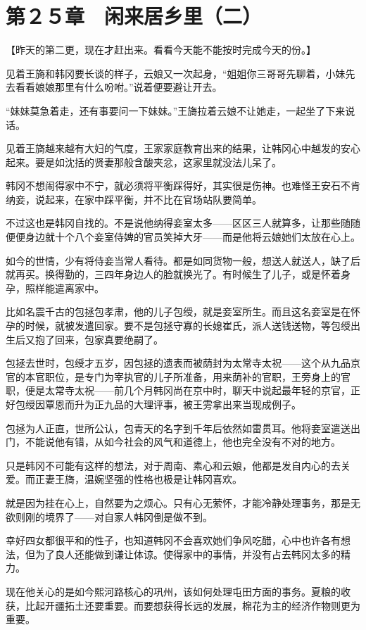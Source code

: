 \section{第２５章　闲来居乡里（二）}

【昨天的第二更，现在才赶出来。看看今天能不能按时完成今天的份。】

见着王旖和韩冈要长谈的样子，云娘又一次起身，“姐姐你三哥哥先聊着，小妹先去看看娘娘那里有什么吩咐。”说着便要避让开去。

“妹妹莫急着走，还有事要问一下妹妹。”王旖拉着云娘不让她走，一起坐了下来说话。

见着王旖越来越有大妇的气度，王家家庭教育出来的结果，让韩冈心中越发的安心起来。要是如沈括的贤妻那般含酸夹忿，这家里就没法儿呆了。

韩冈不想闹得家中不宁，就必须将平衡踩得好，其实很是伤神。也难怪王安石不肯纳妾，说起来，在家中踩平衡，并不比在官场站队要简单。

不过这也是韩冈自找的。不是说他纳得妾室太多——区区三人就算多，让那些随随便便身边就十个八个妾室侍婢的官员笑掉大牙——而是他将云娘她们太放在心上。

如今的世情，少有将侍妾当常人看待。都是如同货物一般，想送人就送人，缺了后就再买。换得勤的，三四年身边人的脸就换光了。有时候生了儿子，或是怀着身孕，照样能遣离家中。

比如名震千古的包拯包孝肃，他的儿子包绶，就是妾室所生。而且这名妾室是在怀孕的时候，就被发遣回家。要不是包拯守寡的长媳崔氏，派人送钱送物，等包绶出生后又抱了回来，包家真要绝嗣了。

包拯去世时，包绶才五岁，因包拯的遗表而被荫封为太常寺太祝——这个从九品京官的本官职位，是专门为宰执官的儿子所准备，用来荫补的官职，王旁身上的官职，便是太常寺太祝——前几个月韩冈尚在京中时，聊天中说起最年轻的京官，正好包绶因覃恩而升为正九品的大理评事，被王雱拿出来当现成例子。

包拯为人正直，世所公认，包青天的名字到千年后依然如雷贯耳。他将妾室遣送出门，不能说他有错，从如今社会的风气和道德上，他也完全没有不对的地方。

只是韩冈不可能有这样的想法，对于周南、素心和云娘，他都是发自内心的去关爱。而正妻王旖，温婉坚强的性格也极是让韩冈喜欢。

就是因为挂在心上，自然要为之烦心。只有心无萦怀，才能冷静处理事务，那是无欲则刚的境界了——对自家人韩冈倒是做不到。

幸好四女都很平和的性子，也知道韩冈不会喜欢她们争风吃醋，心中也许各有想法，但为了良人还能做到谦让体谅。使得家中的事情，并没有占去韩冈太多的精力。

现在他关心的是如今熙河路核心的巩州，该如何处理屯田方面的事务。夏粮的收获，比起开疆拓土还要重要。而要想获得长远的发展，棉花为主的经济作物则更为重要。

